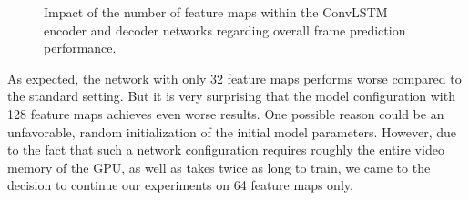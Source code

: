 \begin{figure}[htb]
\begin{subfigure}{0.5\textwidth}
{
  }
  \caption{}
  \label{fig:plot-mm-filter-bce}
\end{subfigure}%
\begin{subfigure}{0.5\textwidth}
  \centering
  \modelA
  \modelB
  \modelC
  \hspace*{-0.6cm}
  {
  }
  \caption{}
  \label{fig:plot-mm-filter-psnr}
\end{subfigure}
\caption[Influences of ConvLSTM Feature Maps]{Impact of the number of feature maps within the ConvLSTM encoder and decoder networks regarding overall frame prediction performance.} \label{fig:plot-mm-filter}
\end{figure}

As expected, the network with only 32 feature maps performs worse compared to the standard setting. But it is very surprising that the model configuration with 128 feature maps achieves even worse results. One possible reason could be an unfavorable, random initialization of the initial model parameters. However, due to the fact that such a network configuration requires roughly the entire video memory of the GPU, as well as takes twice as long to train, we came to the decision to continue our experiments on 64 feature maps only.


